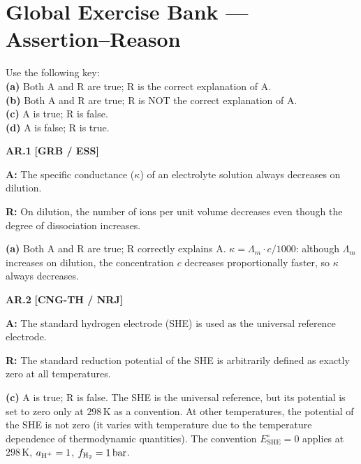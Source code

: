 \chapter*{Global Exercise Bank --- Assertion--Reason}
\label{chap:assertion_reason}

\begin{tcolorbox}[enhanced,colback=subtleamber,colframe=accentamber,arc=2mm,boxrule=1pt,
    title=\textbf{\large Assertion--Reason Questions (All Chapters)}]
Use the following key:\\
\textbf{(a)} Both A and R are true; R is the correct explanation of A.\\
\textbf{(b)} Both A and R are true; R is NOT the correct explanation of A.\\
\textbf{(c)} A is true; R is false.\\
\textbf{(d)} A is false; R is true.
\end{tcolorbox}

\begin{problembox}
\textbf{AR.1} \hfill \textbf{[GRB / ESS]}

\textbf{A:} The specific conductance ($\kappa$) of an electrolyte solution always decreases on dilution.

\textbf{R:} On dilution, the number of ions per unit volume decreases even though the degree of dissociation increases.
\end{problembox}
\begin{solution}
\textbf{(a)} Both A and R are true; R correctly explains A. $\kappa = \Lambda_m \cdot c/1000$: although $\Lambda_m$ increases on dilution, the concentration $c$ decreases proportionally faster, so $\kappa$ always decreases.
\end{solution}

\begin{problembox}
\textbf{AR.2} \hfill \textbf{[CNG-TH / NRJ]}

\textbf{A:} The standard hydrogen electrode (SHE) is used as the universal reference electrode.

\textbf{R:} The standard reduction potential of the SHE is arbitrarily defined as exactly zero at all temperatures.
\end{problembox}
\begin{solution}
\textbf{(c)} A is true; R is false. The SHE is the universal reference, but its potential is set to zero only at $298\,\text{K}$ as a convention. At other temperatures, the potential of the SHE is not zero (it varies with temperature due to the temperature dependence of thermodynamic quantities). The convention $E^\circ_{\text{SHE}} = 0$ applies at $298\,\text{K}$, $a_{\ce{H+}}=1$, $f_{\ce{H2}}=1\,\text{bar}$.
\end{solution}

